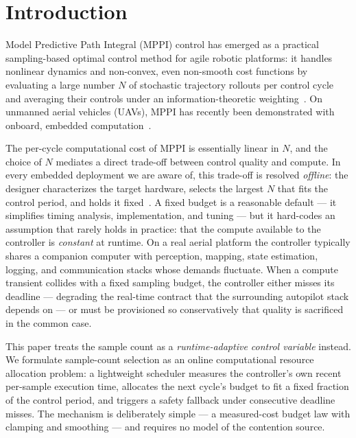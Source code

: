 \documentclass[conference]{IEEEtran}
\begin{document}
\section{Introduction}
\label{sec:intro}

Model Predictive Path Integral (MPPI) control has emerged as a practical
sampling-based optimal control method for agile robotic platforms: it
handles nonlinear dynamics and non-convex, even non-smooth cost functions
by evaluating a large number $N$ of stochastic trajectory rollouts per
control cycle and averaging their controls under an information-theoretic
weighting~\cite{williams2016aggressive,williams2018information}. On
unmanned aerial vehicles (UAVs), MPPI has recently been demonstrated with
onboard, embedded computation~\cite{minarik2024mppi,enrico2025comparison}.

The per-cycle computational cost of MPPI is essentially linear in $N$,
and the choice of $N$ mediates a direct trade-off between control quality
and compute. In every embedded deployment we are aware of, this trade-off
is resolved \emph{offline}: the designer characterizes the target
hardware, selects the largest $N$ that fits the control period, and holds
it fixed~\cite{enrico2025comparison}. A fixed budget is a reasonable
default --- it simplifies timing analysis, implementation, and tuning ---
but it hard-codes an assumption that rarely holds in practice: that the
compute available to the controller is \emph{constant} at runtime. On a
real aerial platform the controller typically shares a companion computer
with perception, mapping, state estimation, logging, and communication
stacks whose demands fluctuate. When a compute transient collides with a
fixed sampling budget, the controller either misses its deadline ---
degrading the real-time contract that the surrounding autopilot stack
depends on --- or must be provisioned so conservatively that quality is
sacrificed in the common case.

This paper treats the sample count as a \emph{runtime-adaptive control
variable} instead. We formulate sample-count selection as an online
computational resource allocation problem: a lightweight scheduler
measures the controller's own recent per-sample execution time, allocates
the next cycle's budget to fit a fixed fraction of the control period, and
triggers a safety fallback under consecutive deadline misses. The
mechanism is deliberately simple --- a measured-cost budget law with
clamping and smoothing --- and requires no model of the contention source.
\end{document}
